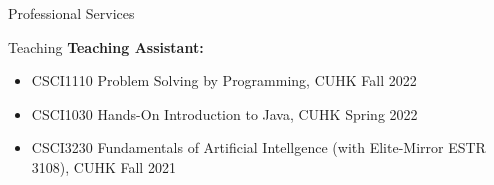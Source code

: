\documentclass[a4paper]{resume} %
\begin{document}
\begin{rSection}{Professional Services}






\end{rSection}


\begin{rSection}{Teaching} 
{\bf Teaching Assistant:}
\vspace{-0.2em}
\begin{itemize}
	\item CSCI1110 Problem Solving by Programming, CUHK \hfill{Fall 2022}
	\item CSCI1030 Hands-On Introduction to Java, CUHK \hfill{Spring 2022}
	\item CSCI3230 Fundamentals of Artificial Intellgence (with Elite-Mirror ESTR 3108), CUHK \hfill{Fall 2021}
\end{itemize}
\end{rSection}
\end{document}

